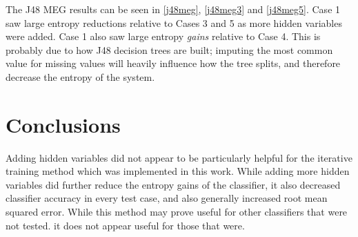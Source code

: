 The J48 MEG results can be seen in \ref{j48meg}, \ref{j48meg3} and \ref{j48meg5}. Case 1 saw large entropy reductions relative to Cases 3 and 5 as more hidden variables were added. Case 1 also saw large entropy \textit{gains} relative to Case 4. This is probably due to how J48 decision trees are built; imputing the most common value for missing values will heavily influence how the tree splits, and therefore decrease the entropy of the system.

\linespread{1.0}








\linespread{1.3}

\section{Conclusions}

Adding hidden variables did not appear to be particularly helpful for the iterative training method which was implemented in this work. While adding more hidden variables did further reduce the entropy gains of the classifier, it also decreased classifier accuracy in every test case, and also generally increased root mean squared error. While this method may prove useful for other classifiers that were not tested. it does not appear useful for those that were.
